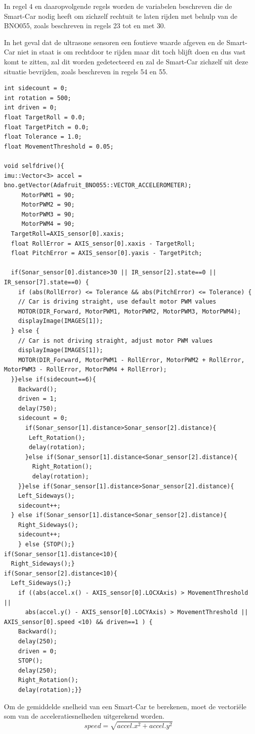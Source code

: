 In regel 4 en daaropvolgende regels worden de variabelen beschreven die de \gls{Smart-Car} nodig heeft om zichzelf rechtuit te laten rijden met behulp van de BNO055\cite{AXIS}, zoals beschreven in regels 23 tot en met 30.

In het geval dat de ultrasone sensoren een foutieve waarde afgeven en de \gls{Smart-Car} niet in staat is om rechtdoor te rijden maar dit toch blijft doen en dus vast komt te zitten, zal dit worden gedetecteerd en zal de \gls{Smart-Car} zichzelf uit deze situatie bevrijden, zoals beschreven in regels 54 en 55.
\begin{lstlisting}
int sidecount = 0;
int rotation = 500;
int driven = 0;
float TargetRoll = 0.0;    
float TargetPitch = 0.0;   
float Tolerance = 1.0;
float MovementThreshold = 0.05;   

void selfdrive(){
imu::Vector<3> accel = bno.getVector(Adafruit_BNO055::VECTOR_ACCELEROMETER);
     MotorPWM1 = 90;
     MotorPWM2 = 90;
     MotorPWM3 = 90;
     MotorPWM4 = 90;
  TargetRoll=AXIS_sensor[0].xaxis;
  float RollError = AXIS_sensor[0].xaxis - TargetRoll;
  float PitchError = AXIS_sensor[0].yaxis - TargetPitch;

  if(Sonar_sensor[0].distance>30 || IR_sensor[2].state==0 || IR_sensor[7].state==0) {
    if (abs(RollError) <= Tolerance && abs(PitchError) <= Tolerance) {
    // Car is driving straight, use default motor PWM values
    MOTOR(DIR_Forward, MotorPWM1, MotorPWM2, MotorPWM3, MotorPWM4);
    displayImage(IMAGES[1]);
  } else {
    // Car is not driving straight, adjust motor PWM values
    displayImage(IMAGES[1]);
    MOTOR(DIR_Forward, MotorPWM1 - RollError, MotorPWM2 + RollError, MotorPWM3 - RollError, MotorPWM4 + RollError);
  }}else if(sidecount==6){
    Backward(); 
    driven = 1;
    delay(750); 
    sidecount = 0;
      if(Sonar_sensor[1].distance>Sonar_sensor[2].distance){
       Left_Rotation();
       delay(rotation);
      }else if(Sonar_sensor[1].distance<Sonar_sensor[2].distance){
        Right_Rotation();
        delay(rotation);
    }}else if(Sonar_sensor[1].distance>Sonar_sensor[2].distance){
    Left_Sideways();
    sidecount++;
  } else if(Sonar_sensor[1].distance<Sonar_sensor[2].distance){
    Right_Sideways();
    sidecount++;
    } else {STOP();}
if(Sonar_sensor[1].distance<10){
  Right_Sideways();}
if(Sonar_sensor[2].distance<10){
  Left_Sideways();}
    if ((abs(accel.x() - AXIS_sensor[0].LOCXAxis) > MovementThreshold || 
      abs(accel.y() - AXIS_sensor[0].LOCYAxis) > MovementThreshold || AXIS_sensor[0].speed <10) && driven==1 ) {
    Backward(); 
    delay(250);
    driven = 0;
    STOP();
    delay(250);
    Right_Rotation();
    delay(rotation);}}
\end{lstlisting}
Om de gemiddelde snelheid van een \gls{Smart-Car} te berekenen, moet de vectoriële som van de acceleratiesnelheden uitgerekend worden.
\begin{equation}
speed = \sqrt{accel.x^2 + accel.y^2}
\end{equation}

